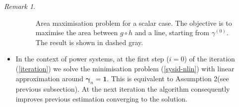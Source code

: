 \documentclass[journal,10pt,onecolumn,draftclsnofoot,]{IEEEtran}
\theoremstyle{plain}
\theoremstyle{definition}
\theoremstyle{remark}
\newtheorem*{remark}{Remark}
\begin{document}
\begin{remark}
\begin{itemize}
\begin{figure}[t]
  \caption{Area maximisation problem for a scalar case. The objective is to maximise the area between $g \circ h$ and a line, starting from $\gamma^{(0)}$. The result is shown in dashed gray.}
  \label{fig1}
  \end{figure}
  \item In the context of power systems, at the first step ($i = 0$) of the iteration (\ref{iteration}) we solve the minimisation problem (\ref{sysid-nlin}) with linear approximation around $\bm{\gamma}_n = \bm{1}$. This is equivalent to Assumption 2(see previous subsection). At the next iteration the algorithm consequently improves previous estimation converging to the solution. 
\end{itemize}
\end{remark}
\end{document}
